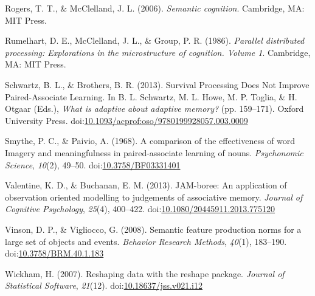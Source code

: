 \documentclass[english,man]{apa6}
\theoremstyle{definition}
\theoremstyle{definition}
\theoremstyle{definition}
\theoremstyle{remark}
\begin{document}
\hypertarget{ref-Rogers2006}{}
Rogers, T. T., \& McClelland, J. L. (2006). \emph{Semantic cognition}.
Cambridge, MA: MIT Press.

\hypertarget{ref-Rumelhart1986}{}
Rumelhart, D. E., McClelland, J. L., \& Group, P. R. (1986).
\emph{Parallel distributed processing: Explorations in the
microstructure of cognition. Volume 1}. Cambridge, MA: MIT Press.

\hypertarget{ref-Schwartz2013}{}
Schwartz, B. L., \& Brothers, B. R. (2013). Survival Processing Does Not
Improve Paired-Associate Learning. In B. L. Schwartz, M. L. Howe, M. P.
Toglia, \& H. Otgaar (Eds.), \emph{What is adaptive about adaptive
memory?} (pp. 159--171). Oxford University Press.
doi:\href{https://doi.org/10.1093/acprof:oso/9780199928057.003.0009}{10.1093/acprof:oso/9780199928057.003.0009}

\hypertarget{ref-Smythe1968}{}
Smythe, P. C., \& Paivio, A. (1968). A comparison of the effectiveness
of word Imagery and meaningfulness in paired-associate learning of
nouns. \emph{Psychonomic Science}, \emph{10}(2), 49--50.
doi:\href{https://doi.org/10.3758/BF03331401}{10.3758/BF03331401}

\hypertarget{ref-Valentine2013}{}
Valentine, K. D., \& Buchanan, E. M. (2013). JAM-boree: An application
of observation oriented modelling to judgements of associative memory.
\emph{Journal of Cognitive Psychology}, \emph{25}(4), 400--422.
doi:\href{https://doi.org/10.1080/20445911.2013.775120}{10.1080/20445911.2013.775120}

\hypertarget{ref-Vinson2008}{}
Vinson, D. P., \& Vigliocco, G. (2008). Semantic feature production
norms for a large set of objects and events. \emph{Behavior Research
Methods}, \emph{40}(1), 183--190.
doi:\href{https://doi.org/10.3758/BRM.40.1.183}{10.3758/BRM.40.1.183}

\hypertarget{ref-Wickham2007}{}
Wickham, H. (2007). Reshaping data with the reshape package.
\emph{Journal of Statistical Software}, \emph{21}(12).
doi:\href{https://doi.org/10.18637/jss.v021.i12}{10.18637/jss.v021.i12}
\end{document}

